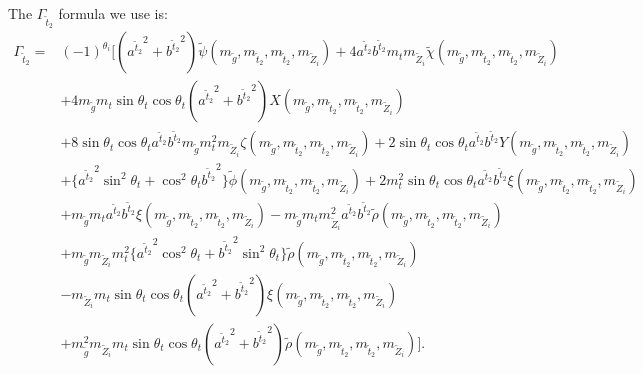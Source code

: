 \documentclass[final,3p,times]{elsarticle}
\begin{document}
The $\Gamma_{\tilde{t}_2}$ formula we use is:
\begin{equation}
\begin{aligned}
\Gamma_{\tilde{t}_2} = & (-1)^{\theta_i}\Big[({a^{\tilde{t}_2}}^2+{b^{\tilde{t}_2}}^2)\tilde{\psi} (m_{\tilde{g}},m_{\tilde{t}_2}, m_{\tilde{t}_2}, m_{\tilde{Z}_i})  + 4 a^{\tilde{t}_2} b^{\tilde{t}_2} m_{t} m_{\tilde{Z}_i} \tilde{\chi} (m_{\tilde{g}},m_{\tilde{t}_2}, m_{\tilde{t}_2}, m_{\tilde{Z}_i}) \\ & + 4 m_{\tilde{g}}m_{t}\sin\theta_{t}\cos\theta_{t}({a^{\tilde{t}_2}}^2 + {b^{\tilde{t}_2}}^2) X(m_{\tilde{g}},m_{\tilde{t}_2}, m_{\tilde{t}_2}, m_{\tilde{Z}_i}) \\ & + 8\sin\theta_t \cos\theta_t a^{\tilde{t}_2} b^{\tilde{t}_2}m_{\tilde{g}}m_{t}^2 m_{\tilde{Z}_{i}} \zeta (m_{\tilde{g}},m_{\tilde{t}_2}, m_{\tilde{t}_2}, m_{\tilde{Z}_i}) + 2\sin\theta_t \cos\theta_t a^{\tilde{t}_2} b^{\tilde{t}_2} Y(m_{\tilde{g}},m_{\tilde{t}_2}, m_{\tilde{t}_2}, m_{\tilde{Z}_i}) \\ & + \{{a^{\tilde{t}_2}}^2 \sin^2 \theta_t  + \cos^2 \theta_t {b^{\tilde{t}_2}}^2\} \tilde{\phi} (m_{\tilde{g}},m_{\tilde{t}_2}, m_{\tilde{t}_2}, m_{\tilde{Z}_i}) + 2m_{t}^2 \sin\theta_t \cos\theta_t a^{\tilde{t}_2} b^{\tilde{t}_2} \xi (m_{\tilde{g}},m_{\tilde{t}_2}, m_{\tilde{t}_2}, m_{\tilde{Z}_i})  \\ & + m_{\tilde{g}}m_{t} a^{\tilde{t}_2} b^{\tilde{t}_2} \xi (m_{\tilde{g}},m_{\tilde{t}_2}, m_{\tilde{t}_2}, m_{\tilde{Z}_i}) -m_{\tilde{g}}m_{t} m_{\tilde{Z}_i}^2 a^{\tilde{t}_2} b^{\tilde{t}_2} \tilde{\rho} (m_{\tilde{g}},m_{\tilde{t}_2}, m_{\tilde{t}_2}, m_{\tilde{Z}_i}) \\ & + m_{\tilde{g}}m_{\tilde{Z}_i} m_{t}^2 \{{a^{\tilde{t}_2}}^2 \cos^2 \theta_t + {b^{\tilde{t}_2}}^2 \sin^2 \theta_t \} \tilde{\rho} (m_{\tilde{g}},m_{\tilde{t}_2}, m_{\tilde{t}_2}, m_{\tilde{Z}_i}) \\ & - m_{\tilde{Z}_i} m_{t} \sin\theta_t \cos \theta_t ({a^{\tilde{t}_2}}^2 + {b^{\tilde{t}_2}}^2) \xi (m_{\tilde{g}},m_{\tilde{t}_2}, m_{\tilde{t}_2}, m_{\tilde{Z}_i}) \\ & + m_{\tilde{g}}^2 m_{\tilde{Z}_i} m_{t} \sin \theta_t \cos \theta_t ({a^{\tilde{t}_2}}^2 + {b^{\tilde{t}_2}}^2) \tilde{\rho} (m_{\tilde{g}},m_{\tilde{t}_2}, m_{\tilde{t}_2}, m_{\tilde{Z}_i})\Big].
\end{aligned}
\end{equation}
\end{document}
